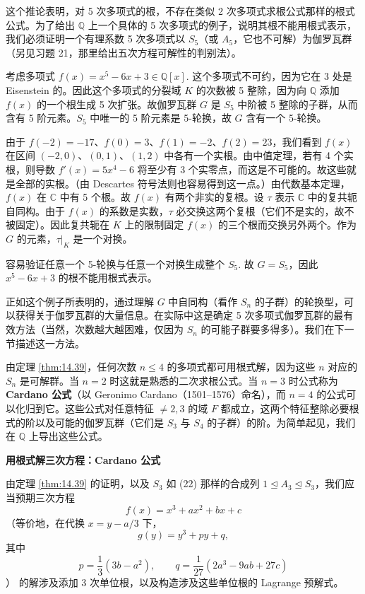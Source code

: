这个推论表明，对 5 次多项式的根，不存在类似 2 次多项式求根公式那样的根式公式。为了给出 \(\mathbb{Q}\) 上一个具体的 5 次多项式的例子，说明其根不能用根式表示，我们必须证明一个有理系数 5 次多项式以 \(S_5\)（或 \(A_5\)，它也不可解）为伽罗瓦群（另见习题 21，那里给出五次方程可解性的判别法）。

\begin{example}
考虑多项式 \(f(x) = x^5-6x+3 \in \mathbb{Q}[x]\). 这个多项式不可约，因为它在 3 处是 Eisenstein 的。因此这个多项式的分裂域 \(K\) 的次数被 5 整除，因为向 \(\mathbb{Q}\) 添加 \(f(x)\) 的一个根生成 5 次扩张。故伽罗瓦群 \(G\) 是 \(S_5\) 中阶被 5 整除的子群，从而含有 5 阶元素。\(S_5\) 中唯一的 5 阶元素是 5-轮换，故 \(G\) 含有一个 5-轮换。

由于 \(f(-2) = -17\)、\(f(0) = 3\)、\(f(1) = -2\)、\(f(2) = 23\)，我们看到 \(f(x)\) 在区间 \((-2, 0)\)、\((0, 1)\)、\((1, 2)\) 中各有一个实根。由中值定理，若有 4 个实根，则导数 \(f'(x) = 5x^4-6\) 将至少有 3 个实零点，而这是不可能的。故这些就是全部的实根。（由 Descartes 符号法则也容易得到这一点。）由代数基本定理，\(f(x)\) 在 \(\mathbb{C}\) 中有 5 个根。故 \(f(x)\) 有两个非实的复根。设 \(\tau\) 表示 \(\mathbb{C}\) 中的复共轭自同构。由于 \(f(x)\) 的系数是实数，\(\tau\) 必交换这两个复根（它们不是实的，故不被固定）。因此复共轭在 \(K\) 上的限制固定 \(f(x)\) 的三个根而交换另外两个。作为 \(G\) 的元素，\(\tau|_K\) 是一个对换。

容易验证任意一个 5-轮换与任意一个对换生成整个 \(S_5\). 故 \(G = S_5\)，因此 \(x^5-6x+3\) 的根不能用根式表示。
\end{example}

正如这个例子所表明的，通过理解 \(G\) 中自同构（看作 \(S_n\) 的子群）的轮换型，可以获得关于伽罗瓦群的大量信息。在实际中这是确定 5 次多项式伽罗瓦群的最有效方法（当然，次数越大越困难，仅因为 \(S_n\) 的可能子群要多得多）。我们在下一节描述这一方法。

由定理 \ref{thm:14.39}，任何次数 \(n \leq 4\) 的多项式都可用根式解，因为这些 \(n\) 对应的 \(S_n\) 是可解群。当 \(n = 2\) 时这就是熟悉的二次求根公式。当 \(n = 3\) 时公式称为 \textbf{Cardano 公式}（以 Geronimo Cardano（1501--1576）命名），而 \(n = 4\) 的公式可以化归到它。这些公式对任意特征 \(\neq 2, 3\) 的域 \(F\) 都成立，这两个特征整除必要根式的阶以及可能的伽罗瓦群（它们是 \(S_3\) 与 \(S_4\) 的子群）的阶。为简单起见，我们在 \(\mathbb{Q}\) 上导出这些公式。

\noindent\textbf{用根式解三次方程：Cardano 公式}

由定理 \ref{thm:14.39} 的证明，以及 \(S_3\) 如 (22) 那样的合成列 \(1 \unlhd A_3 \unlhd S_3\)，我们应当预期三次方程
\[
f(x) = x^3+ax^2+bx+c
\]
（等价地，在代换 \(x = y-a/3\) 下，
\[
g(y) = y^3+py+q,
\]
其中
\[
p = \frac{1}{3}(3b-a^2), \qquad q = \frac{1}{27}(2a^3-9ab+27c)
\]
）
的解涉及添加 3 次单位根，以及构造涉及这些单位根的 Lagrange 预解式。


